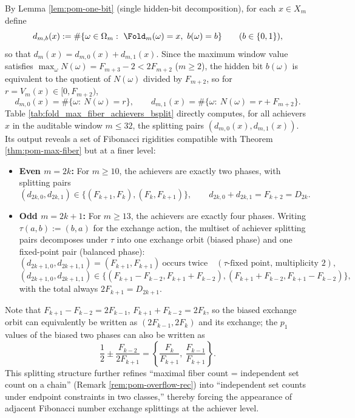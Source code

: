 \begin{remark}\label{rem:pom-max-fiber-achievers-bsplit}
By Lemma \ref{lem:pom-one-bit} (single hidden-bit decomposition), for each \(x\in X_m\) define
\[
d_{m,b}(x):=\#\{\omega\in\Omega_m:\ \Fold_m(\omega)=x,\ b(\omega)=b\}\qquad(b\in\{0,1\}),
\]
so that \(d_m(x)=d_{m,0}(x)+d_{m,1}(x)\).
Since the maximum window value satisfies \(\max_{\omega}N(\omega)=F_{m+3}-2<2F_{m+2}\) (\(m\ge 2\)), the hidden bit \(b(\omega)\) is equivalent to the quotient of \(N(\omega)\) divided by \(F_{m+2}\), so for \(r=V_m(x)\in[0,F_{m+2})\),
\[
d_{m,0}(x)=\#\{\omega:\ N(\omega)=r\},\qquad
d_{m,1}(x)=\#\{\omega:\ N(\omega)=r+F_{m+2}\}.
\]
Table \ref{tab:fold_max_fiber_achievers_bsplit} directly computes, for all achievers \(x\) in the auditable window \(m\le 32\), the splitting pairs \((d_{m,0}(x),d_{m,1}(x))\).
Its output reveals a set of Fibonacci rigidities compatible with Theorem \ref{thm:pom-max-fiber} but at a finer level:
\begin{itemize}
  \item \textbf{Even \(m=2k\):} For \(m\ge 10\), the achievers are exactly two phases, with splitting pairs
  \[
  (d_{2k,0},d_{2k,1})\in\{(F_{k+1},F_k),(F_k,F_{k+1})\},\qquad d_{2k,0}+d_{2k,1}=F_{k+2}=D_{2k}.
  \]
  \item \textbf{Odd \(m=2k+1\):} For \(m\ge 13\), the achievers are exactly four phases. Writing \(\tau(a,b):=(b,a)\) for the exchange action, the multiset of achiever splitting pairs decomposes under \(\tau\) into one exchange orbit (biased phase) and one fixed-point pair (balanced phase):
  \[
  (d_{2k+1,0},d_{2k+1,1})=(F_{k+1},F_{k+1})\ \text{occurs twice}\quad(\tau\text{-fixed point, multiplicity }2),
  \]
  \[
  (d_{2k+1,0},d_{2k+1,1})\in\{(F_{k+1}-F_{k-2},F_{k+1}+F_{k-2}),(F_{k+1}+F_{k-2},F_{k+1}-F_{k-2})\},
  \]
  with the total always \(2F_{k+1}=D_{2k+1}\).
\end{itemize}
Note that
\(
F_{k+1}-F_{k-2}=2F_{k-1}
\),
\(
F_{k+1}+F_{k-2}=2F_{k}
\),
so the biased exchange orbit can equivalently be written as \((2F_{k-1},2F_k)\) and its exchange; the \(p_1\) values of the biased two phases can also be written as
\[
\frac12\pm\frac{F_{k-2}}{2F_{k+1}}
=\left\{\frac{F_k}{F_{k+1}},\ \frac{F_{k-1}}{F_{k+1}}\right\}.
\]
This splitting structure further refines ``maximal fiber count = independent set count on a chain'' (Remark \ref{rem:pom-overflow-rec}) into ``independent set counts under endpoint constraints in two classes,'' thereby forcing the appearance of adjacent Fibonacci number exchange splittings at the achiever level.
\end{remark}


